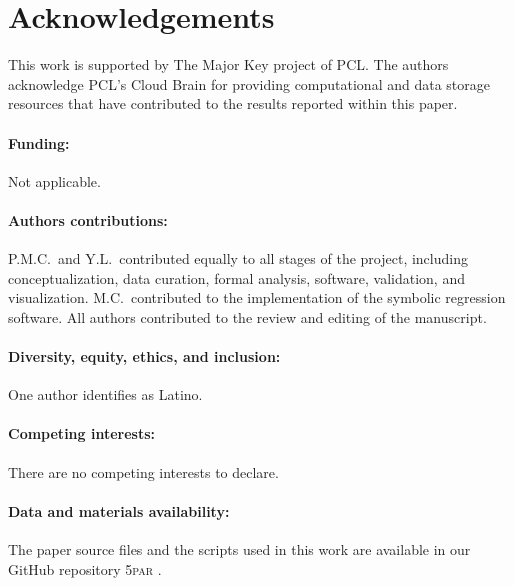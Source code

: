 \documentclass[12pt]{article}
\begin{document}
\clearpage  %










\section*{Acknowledgements}
This work is supported by The Major Key project of PCL.
The authors acknowledge PCL's Cloud Brain for providing computational
and data storage resources that have contributed to the results reported
within this paper.

\paragraph{Funding:}
Not applicable.

\paragraph{Authors contributions:}
P.M.C.\ and Y.L.\ contributed equally to all stages of the project,
including conceptualization, data curation, formal analysis, software,
validation, and visualization.
M.C.\ contributed to the implementation of the symbolic regression
software.
All authors contributed to the review and editing of the manuscript.

\paragraph{Diversity, equity, ethics, and inclusion:}
One author identifies as Latino.

\paragraph{Competing interests:}
There are no competing interests to declare.

\paragraph{Data and materials availability:}
The paper source files and the scripts used in this work are available
in our GitHub repository \textsc{5par} \cite{5par}.
\end{document}

